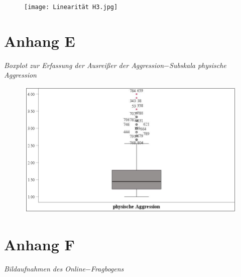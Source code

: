 \begin{appendices}
    \begin{figure}[htb!]
        \centering
            \texttt{[image: Linearität H3.jpg]}

    \end{figure}
    
    


    \chapter*{Anhang E}            \label{Boxplot_phAggro}
    \noindent \textit{Boxplot zur Erfassung der Ausreißer der Aggression$-$Subskala physische Aggression}

    \begin{figure}[htb!]
        \centering
            \includegraphics[width=\textwidth]{Boxplot ph_aggro.jpg}

    \end{figure}
    
    


    \chapter*{Anhang F}  \label{Fragebogen}
    \noindent \textit{Bildaufnahmen des Online$-$Fragbogens}


\end{appendices}
